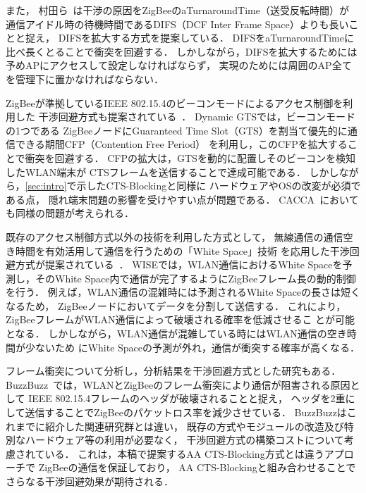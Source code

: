\documentclass[12pt]{jreport}
\begin{document}
また，
村田ら~\cite{murata14:wlan_zigbee}は干渉の原因をZigBeeのaTurnaroundTime（送受反転時間）が
通信アイドル時の待機時間であるDIFS（DCF Inter Frame Space）よりも長いことと捉え，
DIFSを拡大する方式を提案している．
DIFSをaTurnaroundTimeに比べ長くとることで衝突を回避する．
しかしながら，DIFSを拡大するためには予めAPにアクセスして設定しなければならず，
実現のためには周囲のAP全てを管理下に置かなければならない．

ZigBeeが準拠しているIEEE 802.15.4のビーコンモードによるアクセス制御を利用した
干渉回避方式も提案されている~\cite{huang09:wlan_zigbee}．
Dynamic GTSでは，ビーコンモードの1つである
ZigBeeノードにGuaranteed Time Slot（GTS）を割当て優先的に通信できる期間CFP（Contention Free Period）
を利用し，このCFPを拡大することで衝突を回避する．
CFPの拡大は，GTSを動的に配置しそのビーコンを検知したWLAN端末が
CTSフレームを送信することで達成可能である．
しかしながら，\ref{sec:intro}で示したCTS-Blockingと同様に
ハードウェアやOSの改変が必須である点，
隠れ端末問題の影響を受けやすい点が問題である．
CACCA~\cite{tytgat12:wlan_zigbee}においても同様の問題が考えられる．

既存のアクセス制御方式以外の技術を利用した方式として，
無線通信の通信空き時間を有効活用して通信を行うための「White Space」技術
を応用した干渉回避方式が提案されている~\cite{huang10:beyond_coexist}．
WISEでは，WLAN通信におけるWhite Spaceを予測し，そのWhite
Space内で通信が完了するようにZigBeeフレーム長の動的制御を行う．
例えば，WLAN通信の混雑時には予測されるWhite Spaceの長さは短くなるため，
ZigBeeノードにおいてデータを分割して送信する．
これにより，ZigBeeフレームがWLAN通信によって破壊される確率を低減させるこ
とが可能となる．
しかしながら，WLAN通信が混雑している時にはWLAN通信の空き時間が少ないため
にWhite Spaceの予測が外れ，通信が衝突する確率が高くなる．

フレーム衝突について分析し，分析結果を干渉回避方式とした研究もある．
BuzzBuzz~\cite{liang10:wifi_zigbee_survive}では，WLANとZigBeeのフレーム衝突により通信が阻害される原因として
IEEE 802.15.4フレームのヘッダが破壊されることと捉え，
ヘッダを2重にして送信することでZigBeeのパケットロス率を減少させている．
BuzzBuzzはこれまでに紹介した関連研究群とは違い，
既存の方式やモジュールの改造及び特別なハードウェア等の利用が必要なく，
干渉回避方式の構築コストについて考慮されている．
これは，本稿で提案するAA CTS-Blocking方式とは違うアプローチで
ZigBeeの通信を保証しており，
AA CTS-Blockingと組み合わせることでさらなる干渉回避効果が期待される．
\end{document}
